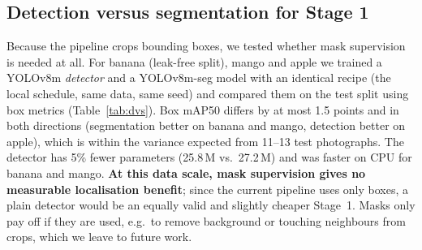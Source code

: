 \documentclass[10pt,twocolumn]{article}
\begin{document}
\subsection{Detection versus segmentation for Stage 1}\label{sec:dvs}
Because the pipeline crops bounding boxes, we tested whether mask supervision is needed at all. For banana (leak-free split), mango and apple we trained a YOLOv8m \emph{detector} and a YOLOv8m-seg model with an identical recipe (the local schedule, same data, same seed) and compared them on the test split using box metrics (Table~\ref{tab:dvs}). Box mAP50 differs by at most 1.5 points and in both directions (segmentation better on banana and mango, detection better on apple), which is within the variance expected from 11--13 test photographs. The detector has 5\% fewer parameters (25.8\,M vs.\ 27.2\,M) and was faster on CPU for banana and mango. \textbf{At this data scale, mask supervision gives no measurable localisation benefit}; since the current pipeline uses only boxes, a plain detector would be an equally valid and slightly cheaper Stage~1. Masks only pay off if they are used, e.g.\ to remove background or touching neighbours from crops, which we leave to future work.

\begin{table}[t]
\centering\small
\caption{Stage-1 ablation: YOLOv8m detection (det) vs.\ segmentation (seg) trained with an identical local recipe; test split, box metrics (\%). CPU: mean single-image latency incl.\ pre/post-processing. Mango/apple seg models here are local retrains, so they differ slightly from Table~\ref{tab:seg}.}
\label{tab:dvs}
\setlength{\tabcolsep}{3.5pt}
\end{table}
\end{document}
